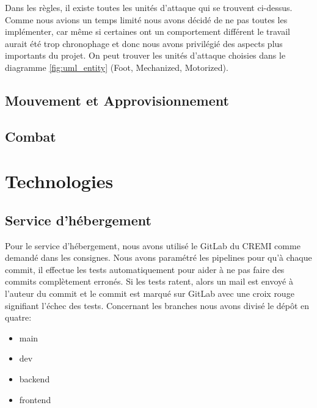 Dans les règles, il existe toutes les unités d'attaque qui se trouvent ci-dessus. Comme nous avions un temps limité nous avons décidé de ne pas toutes les implémenter, car même si certaines ont un comportement différent le travail aurait été trop chronophage et donc nous avons privilégié des aspects plus importants du projet. On peut trouver les unités d'attaque choisies dans le diagramme \ref{fig:uml_entity} (Foot, Mechanized, Motorized).

\subsection{Mouvement et Approvisionnement}



\subsection{Combat}



\section{Technologies}

\subsection{Service d'hébergement}

Pour le service d'hébergement, nous avons utilisé le GitLab du CREMI comme demandé dans les consignes. Nous avons paramétré les pipelines pour qu'à chaque commit, il effectue les tests automatiquement pour aider à ne pas faire des commits complètement erronés.
Si les tests ratent, alors un mail est envoyé à l'auteur du commit et le commit est marqué sur GitLab avec une croix rouge signifiant l'échec des tests. Concernant les branches nous avons divisé le dépôt en quatre:
\begin{itemize}
    \item main
    \item dev
    \item backend
    \item frontend
\end{itemize}

